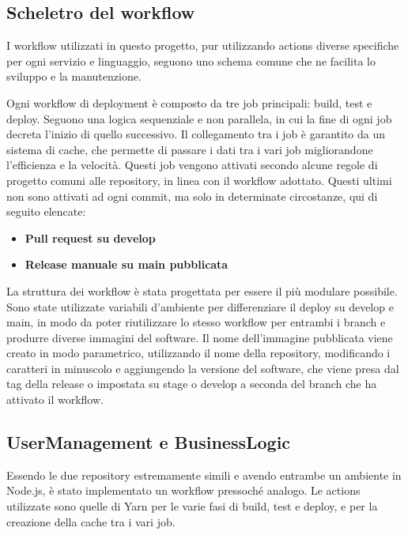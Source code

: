 \subsection{Scheletro del workflow} 

I workflow utilizzati in questo progetto, pur utilizzando actions diverse specifiche per ogni servizio e linguaggio, seguono uno schema comune che ne facilita lo sviluppo e la manutenzione.

\vspace{0.5cm}

Ogni workflow di deployment è composto da tre job principali: build, test e deploy. Seguono una logica sequenziale e non parallela, in cui la fine di ogni job decreta l'inizio di quello successivo. Il collegamento tra i job è garantito da un sistema di cache, che permette di passare i dati tra i vari job migliorandone l'efficienza e la velocità.
Questi job vengono attivati secondo alcune regole di progetto comuni alle repository, in linea con il workflow adottato. Questi ultimi non sono attivati ad ogni commit, ma solo in determinate circostanze, qui di seguito elencate:
\begin{itemize}
    \item \textbf{Pull request su develop} 
    \item \textbf{Release manuale su main pubblicata}
\end{itemize}

La struttura dei workflow è stata progettata per essere il più modulare possibile. Sono state utilizzate variabili d'ambiente per differenziare il deploy su develop e main, in modo da poter riutilizzare lo stesso workflow per entrambi i branch e produrre diverse immagini del software. Il nome dell'immagine pubblicata viene creato in modo parametrico, utilizzando il nome della repository, modificando i caratteri in minuscolo e aggiungendo la versione del software, che viene presa dal tag della release o impostata su stage o develop a seconda del branch che ha attivato il workflow.

\subsection{UserManagement e BusinessLogic} 
Essendo le due repository estremamente simili e avendo entrambe un ambiente in Node.js, è stato implementato un workflow pressoché analogo. Le actions utilizzate sono quelle di Yarn per le varie fasi di build, test e deploy, e per la creazione della cache tra i vari job.

